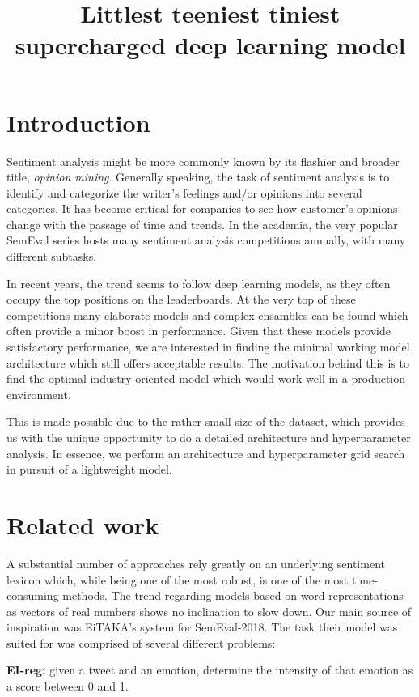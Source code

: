 \documentclass[10pt, a4paper]{article}
\title{Littlest teeniest tiniest supercharged deep learning model}
\begin{document}
\maketitleabstract

\section{Introduction}

Sentiment analysis might be more commonly known by its flashier and broader title, \textit{opinion mining}. 
Generally speaking, the task of sentiment analysis is to identify and categorize the writer's feelings and/or opinions into several categories. 
It has become critical for companies to see how customer's opinions change with the passage of time and trends. 
In the academia, the very popular SemEval series hosts many sentiment analysis competitions annually, with many different subtasks.

In recent years, the trend seems to follow deep learning models,
as they often occupy the top positions on the leaderboards.
At the very top of these competitions many elaborate models 
and complex ensambles can be found
which often provide a minor boost in performance.
Given that these models provide satisfactory performance,
we are interested in finding the minimal working model architecture
which still offers acceptable results.
The motivation behind this is to find the optimal industry oriented
model which would work well in a production environment.

This is made possible due to the rather small size of the dataset,
which provides us with the unique opportunity to do a detailed
architecture and hyperparameter analysis.
In essence, we perform an architecture and hyperparameter grid
search in pursuit of a lightweight model.

\section{Related work}
A substantial number of approaches rely greatly on an underlying sentiment lexicon \citep{lexicon_paper} which, while being one of the most robust, is one of the most time-consuming methods. The trend regarding models based on word representations as vectors of real numbers \citep{w2v} shows no inclination to slow down. Our main source of inspiration was EiTAKA's system \citep{mohammed-semeval} for SemEval-2018. The task their model was suited for was comprised of several different problems:

\textbf{EI-reg:} given a tweet and an emotion, determine the intensity of that emotion as a score between 0 and 1.
\end{document}

